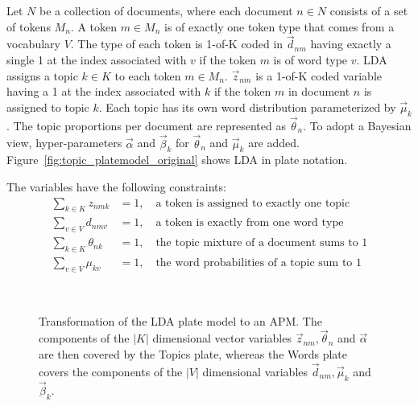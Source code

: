 Let $N$ be a collection of documents, where each document $n \in N$ consists of a set of tokens $M_n$. A token $m \in M_n$ is of exactly one token type that comes from a vocabulary $V$. The type of each token is 1-of-K coded in $\vec d_{nm}$ having exactly a single 1 at the index associated with $v$ if the token $m$ is of word type $v$. LDA assigns a topic $k \in K$ to each token $m \in M_n$. $\vec z_{nm}$ is a 1-of-K coded variable having a 1 at the index associated with $k$ if the token $m$ in document $n$ is assigned to topic $k$. Each topic has its own word distribution parameterized by $\vec \mu_k$. The topic proportions per document are represented as $\vec \theta_n$. To adopt a Bayesian view, hyper-parameters $\vec \alpha$ and $\vec \beta_k$ for $\vec \theta_n$ and $\vec \mu_k$ are added. Figure~\ref{fig:topic_platemodel_original} shows LDA in plate notation.

The variables have the following constraints:
\begin{align}
\sum_{k \in K} z_{nmk} &= 1,\quad \text{a token is assigned to exactly one topic}\\
\sum_{v \in V} d_{nmv} &= 1,\quad \text{a token is exactly from one word type}\\
\sum_{k \in K} \theta_{nk} &= 1,\quad \text{the topic mixture of a document sums to 1}\\
\sum_{v \in V} \mu_{kv} &= 1,\quad \text{the word probabilities of a topic sum to 1}
\end{align}

\begin{figure}[t]
\begin{minipage}[t]{0.49\linewidth}
	\begin{center}
	\end{center}
\end{minipage}
\hspace{0.0cm}
\begin{minipage}[t]{0.49\linewidth}
	\begin{center}
	\end{center}
\end{minipage}\\
\caption[Transformation of LDA plate model to an APM]{Transformation of the LDA plate model to an APM. The components of the $|K|$ dimensional vector variables $\vec z_{nm}, \vec \theta_n$ and $\vec \alpha$ are then covered by the Topics plate, whereas the Words plate covers the components of the $|V|$ dimensional variables $\vec d_{nm}, \vec \mu_k$ and $\vec \beta_k$.}
\label{img:topic_platemodels}
\end{figure}

